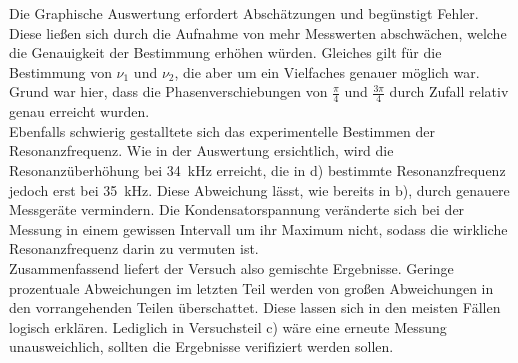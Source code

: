 Die Graphische Auswertung erfordert Abschätzungen und begünstigt Fehler. Diese ließen sich
durch die Aufnahme von mehr Messwerten abschwächen, welche die Genauigkeit der Bestimmung erhöhen würden.
Gleiches gilt für die Bestimmung von $\nu_1$ und $\nu_2$, die aber um ein Vielfaches
genauer möglich war. Grund war hier, dass die Phasenverschiebungen von $\frac{\pi}{4}$ und
$\frac{3 \pi}{4}$ durch Zufall relativ genau erreicht wurden.\\
Ebenfalls schwierig gestalltete sich das experimentelle Bestimmen der Resonanzfrequenz. Wie in
der Auswertung ersichtlich, wird die Resonanzüberhöhung bei \SI{34}{\kilo\hertz} erreicht,
die in d) bestimmte Resonanzfrequenz jedoch erst bei \SI{35}{\kilo\hertz}. Diese Abweichung
lässt, wie bereits in b), durch genauere Messgeräte vermindern. Die Kondensatorspannung veränderte sich
bei der Messung in einem gewissen Intervall um ihr Maximum nicht, sodass die wirkliche Resonanzfrequenz
darin zu vermuten ist.\\
Zusammenfassend liefert der Versuch also gemischte Ergebnisse. Geringe prozentuale Abweichungen
im letzten Teil werden von großen Abweichungen in den vorrangehenden Teilen überschattet.
Diese lassen sich in den meisten Fällen logisch erklären. Lediglich in Versuchsteil c)
wäre eine erneute Messung unausweichlich, sollten die Ergebnisse verifiziert werden
sollen.
\newpage
\nocite{*}
\printbibliography
